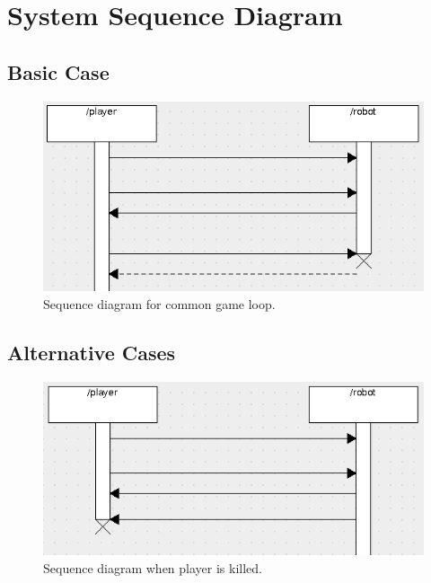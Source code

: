 \documentclass{beamer}
\begin{document}
\section{System Sequence Diagram}
\begin{frame}
\subsection{Basic Case}
\begin{figure}[htb]
\centering
\includegraphics[scale=0.3]{basic-sequence}
\caption{Sequence diagram for common game loop.}
\end{figure}
\subsection{Alternative Cases}
\begin{figure}[htb]
\centering
\includegraphics[scale=0.3]{player-dies-sequence}
\caption{Sequence diagram when player is killed.}
\end{figure}
\end{frame}
\end{document}
